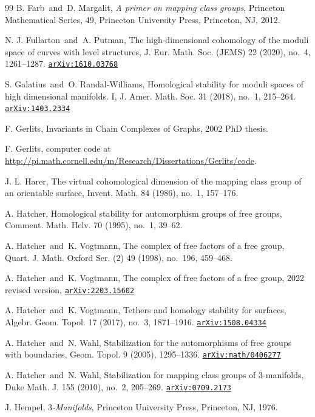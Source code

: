 \documentclass[11pt]{amsart}
\newcommand{\arxiv}[1]{\href{http://arxiv.org/abs/#1}{{\tt arXiv:#1}}}
\numberwithin{equation}{section}
\theoremstyle{plain}
\theoremstyle{definition}
\theoremstyle{remark}
\begin{document}
\begin{thebibliography}{99}
B. Farb\ and\ D. Margalit, {\it A primer on mapping class groups}, Princeton Mathematical Series, 49, Princeton University Press, Princeton, NJ, 2012.

N. J. Fullarton\ and\ A. Putman, The high-dimensional cohomology of the moduli space of curves with level structures, J. Eur. Math. Soc. (JEMS) 22 (2020), no.~4, 1261--1287. \arxiv{1610.03768}

S. Galatius\ and\ O. Randal-Williams, Homological stability for moduli spaces of high dimensional manifolds. I,
J. Amer. Math. Soc. 31 (2018), no.~1, 215--264. \arxiv{1403.2334}

F. Gerlits, Invariants in Chain Complexes of Graphs, 2002 PhD thesis.

F. Gerlits, computer code at \url{http://pi.math.cornell.edu/m/Research/Dissertations/Gerlits/code}.

J. L. Harer, The virtual cohomological dimension of the mapping class group of an orientable surface, Invent. Math. 84 (1986), no.~1, 157--176.

A. Hatcher, Homological stability for automorphism groups of free groups, Comment. Math. Helv. 70 (1995), no.~1, 39--62.

A. Hatcher\ and\ K. Vogtmann, The complex of free factors of a free group, Quart. J. Math. Oxford Ser. (2) 49 (1998), no.~196, 459--468.

A. Hatcher\ and\ K. Vogtmann, The complex of free factors of a free group, 2022 revised version, \arxiv{2203.15602}

A. Hatcher\ and\ K. Vogtmann, Tethers and homology stability for surfaces, Algebr. Geom. Topol. 17 (2017), no.~3, 1871--1916. \arxiv{1508.04334}

A. Hatcher\ and\ N. Wahl, Stabilization for the automorphisms of free groups with boundaries, Geom. Topol. 9 (2005), 1295--1336. \arxiv{math/0406277}

A. Hatcher\ and\ N. Wahl, Stabilization for mapping class groups of 3-manifolds, Duke Math. J. 155 (2010), no.~2, 205--269. \arxiv{0709.2173}

J. Hempel, {\it $3$-Manifolds}, Princeton University Press, Princeton, NJ, 1976.


\end{thebibliography}
\end{document}
